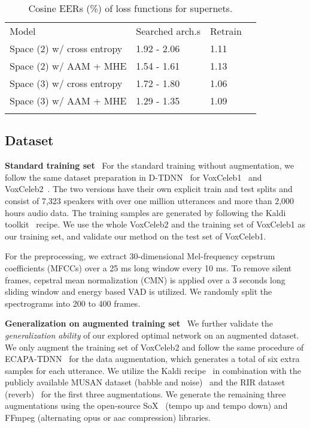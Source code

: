 \documentclass{article}
\begin{document}
\begin{table}[t]
  \caption{Cosine EERs (\%) of loss functions for supernets.}
  \centering
  \begin{tabular}{llll}
  \Xhline{2\arrayrulewidth}
    Model & Searched arch.s & Retrain \\
    \Xhline{1.5\arrayrulewidth}
    Space (2) w/ cross entropy & 1.92 - 2.06 & 1.11 \\ Space (2) w/ AAM + MHE & 1.54 - 1.61 & 1.13 \\ \hline
    Space (3) w/ cross entropy & 1.72 - 1.80 & 1.06 \\
    Space (3) w/ AAM + MHE & 1.29 - 1.35 & 1.09 \\
    \Xhline{2\arrayrulewidth}
  \end{tabular}\label{tab:loss}
\end{table}
\subsection{Dataset}\label{sec:exper_dataset}
\textbf{Standard training set} \, For the standard training without augmentation, we follow the same dataset preparation in D-TDNN~\cite{yu2020densely} for {\selectfont VoxCeleb1}~\cite{nagrani2017voxceleb} and {\selectfont VoxCeleb2}~\cite{chung2018voxceleb2}. The two versions have their own explicit train and test splits and consist of 7,323 speakers with over one million utterances and more than 2,000 hours audio data. The training samples are generated by following the Kaldi toolkit~\cite{povey2011kaldi} recipe. We use the whole {\selectfont VoxCeleb2} and the training set of {\selectfont VoxCeleb1} as our training set, and validate our method on the test set of {\selectfont VoxCeleb1}.

For the preprocessing, we extract 30-dimensional Mel-frequency cepstrum coefficients (MFCCs) over a 25 ms long window every 10 ms. To remove silent frames, cepstral mean normalization (CMN) is applied over a 3 seconds long sliding window and energy based VAD is utilized. We randomly split the spectrograms into 200 to 400 frames.

\textbf{Generalization on augmented training set} \, We further validate the \emph{generalization ability} of our explored optimal network on an augmented dataset. We only augment the training set of {\selectfont VoxCeleb2} and follow the same procedure of ECAPA-TDNN~\cite{desplanques2020ecapa} for the data augmentation, which generates a total of six extra samples for each utterance. We utilize the Kaldi recipe~\cite{povey2011kaldi} in combination with the publicly available MUSAN dataset (babble and noise)~\cite{snyder2015musan} and the RIR dataset (reverb)~\cite{ko2017study} for the first three augmentations. We generate the remaining three augmentations using the open-source SoX~\cite{barras2012sox} (tempo up and tempo down) and FFmpeg (alternating opus or aac compression) libraries.  
\end{document}
